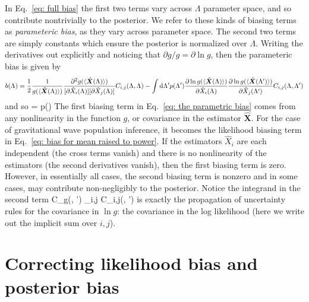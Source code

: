 \documentclass[%
 reprint,
 amsmath,amssymb,
 aps,nofootinbib,nobibnotes,onecolumn,prd
]{revtex4-2}
\begin{document}
In Eq.~\ref{eq: full bias} the first two terms vary across $\Lambda$ parameter space, and so contribute nontrivially to the posterior. We refer to these kinds of biasing terms as \textit{parameteric bias}, as they vary across parameter space. The second two terms are simply constants which ensure the posterior is normalized over $\Lambda$. Writing the derivatives out explicitly and noticing that $\partial g /g = \partial \ln g$, then the parameteric bias is given by
\begin{gather}
b(\Lambda)= \frac{1}{2}\frac{1}{g(\langle \hat{\bm X}(\Lambda)\rangle)}\frac{\partial^2g(\langle \hat{\bm X}(\Lambda)\rangle)}{[\partial\hat{X}_i(\Lambda)][\partial\hat{X}_j(\Lambda)]}C_{i,j}(\Lambda, \Lambda) - \int {\rm d}\Lambda'p(\Lambda')\frac{\partial\ln g(\langle \hat{\bm X}(\Lambda)\rangle)}{\partial\hat{X}_i(\Lambda)} \frac{\partial\ln g(\langle \hat{\bm X}(\Lambda')\rangle)}{\partial\hat{X}_j(\Lambda')}C_{i,j}(\Lambda, \Lambda') 
\label{eq: the parametric bias} 
\end{gather}
and so 
\beq
{} = p(\Lambda)
\eeq
The first biasing term in Eq.~\ref{eq: the parametric bias} comes from any nonlinearity in the function $g$, or covariance in the estimator $\hat{\bm X}$. For the case of gravitational wave population inference, it becomes the likelihood biasing term in Eq.~\ref{eq: bias for mean raised to power}. If the estimators $\hat{X}_i$ are each independent (the cross terms vanish) and there is no nonlinearity of the estimators (the second derivatives vanish), then the first biasing term is zero. 
However, in essentially all cases, the second biasing term is nonzero and in some cases, may contribute non-negligibly to the posterior. Notice the integrand in the second term
\beq
C_{\ln g}(\Lambda, \Lambda') \equiv \sum_{i,j} C_{i,j}(\Lambda, \Lambda') 
\label{eq: general covariance in ln g}
\eeq
is exactly the propagation of uncertainty rules for the covariance in $\ln g$: the covariance in the log likelihood (here we write out the implicit sum over $i,j$).

\section{Correcting likelihood bias and posterior bias}
\label{app: correction in general}
\end{document}
